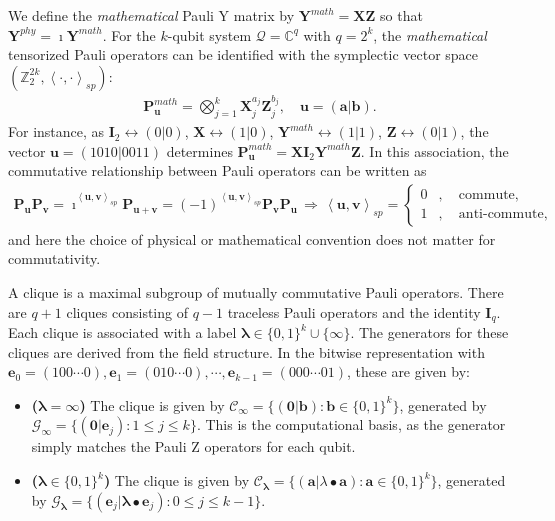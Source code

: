 \documentclass[noinfoline]{imsart}\setcounter{tocdepth}{2}
\renewcommand{\b}[1]{\mathbb{#1}} %
\newcommand{\m}[1]{\mathbf{#1}} %
\renewcommand{\c}[1]{\mathcal{#1}} %
\newcommand{\mb}[1]{\boldsymbol{#1}} %
\newcommand{\innpr}[2]{{\left\langle {#1},{#2}\right\rangle}} %
\theoremstyle{plain}
\begin{document}
\begin{appendix}
We define the \emph{mathematical} Pauli Y matrix by $ \m{Y}^{math} = \m{X} \m{Z}$ so that $\m{Y}^{phy} = \imath \m{Y}^{math}$. For the $k$-qubit system $\c{Q} = \b{C}^{q}$ with $q=2^{k}$, the \emph{mathematical} tensorized Pauli operators can be identified with the symplectic vector space $(\b{Z}_{2}^{2k}, \innpr{\cdot}{\cdot}_{sp})$:
\begin{align*}
    \m{P}_{\m{u}}^{math} = \bigotimes_{j=1}^{k} \m{X}_{j}^{a_{j}} \m{Z}_{j}^{b_{j}}, \quad \m{u} = (\m{a}|\m{b}).
\end{align*}
For instance, as $\m{I}_{2} \leftrightarrow (0 | 0)$, $\m{X} \leftrightarrow (1 | 0)$, $\m{Y}^{math} \leftrightarrow (1 | 1)$, $\m{Z} \leftrightarrow (0 | 1)$, the vector $\m{u} = (1010 \vert 0011)$ determines $\m{P}_{\m{u}}^{math} = \m{X} \m{I}_{2} \m{Y}^{math} \m{Z}$. In this association, the commutative relationship between Pauli operators can be written as
\begin{align}\label{eq:phase:corr}
    \m{P}_{\m{u}} \m{P}_{\m{v}} = \imath^{\innpr{\m{u}}{\m{v}}_{sp}} \m{P}_{\m{u} + \m{v}} = (-1)^{\innpr{\m{u}}{\m{v}}_{sp}} \m{P}_{\m{v}} \m{P}_{\m{u}} \, \Rightarrow \, \innpr{\m{u}}{\m{v}}_{sp} = \begin{cases}
        0 &, \quad \text{commute}, \\
        1 &, \quad \text{anti-commute},
    \end{cases}
\end{align}
and here the choice of physical or mathematical convention does not matter for commutativity.

A clique is a maximal subgroup of mutually commutative Pauli operators. There are $q+1$ cliques consisting of $q-1$ traceless Pauli operators and the identity $\m{I}_{q}$. Each clique is associated with a label $\mb{\lambda} \in \{0, 1\}^{k} \cup \{\infty\}$. The generators for these cliques are derived from the field structure. In the bitwise representation with $\m{e}_{0} = (100\cdots0), \m{e}_{1} = (010\cdots0), \cdots, \m{e}_{k-1} = (000\cdots01)$, these are given by:
\begin{itemize}[leftmargin = *]
\item \textbf{($\mb{\lambda} = \infty$)} The clique is given by $\c{C}_{\infty} = \{(\m{0} | \m{b}) : \m{b} \in \{0, 1\}^{k} \}$, generated by $\c{G}_{\infty} = \{(\m{0} | \m{e}_{j}) : 1 \le j \le k\}$. This is the computational basis, as the generator simply matches the Pauli Z operators for each qubit.
\item \textbf{($\mb{\lambda} \in \{0, 1\}^{k}$)} The clique is given by $\c{C}_{\mb{\lambda}} = \{(\m{a} | \lambda \bullet \m{a}) : \m{a} \in \{0, 1\}^{k} \}$, generated by $\c{G}_{\mb{\lambda}} = \{(\m{e}_{j} | \mb{\lambda} \bullet \m{e}_{j}) : 0 \le j \le k-1\}$.
\end{itemize}


\end{appendix}
\end{document}
